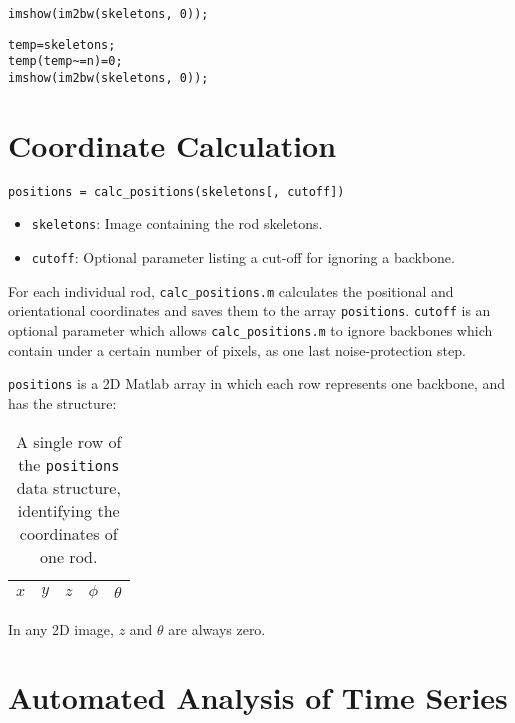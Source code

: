 \begin{lstlisting}[label=ls:allbb,caption=Show all backbones as an image]
imshow(im2bw(skeletons, 0));
\end{lstlisting}

\begin{lstlisting}[label=ls:onebb,caption=Show only backbone with label $n$]
temp=skeletons;
temp(temp~=n)=0;
imshow(im2bw(skeletons, 0));
\end{lstlisting}

\section{Coordinate Calculation}

\texttt{positions = calc\_positions(skeletons[, cutoff])}

\begin{itemize}
\item \texttt{skeletons}: Image containing the rod skeletons.
\item \texttt{cutoff}: Optional parameter listing a cut-off for ignoring a backbone.
\end{itemize}

For each individual rod, \texttt{calc\_positions.m} calculates the positional and
orientational coordinates and saves them to the array \texttt{positions}.  
\texttt{cutoff} is an optional parameter which allows \texttt{calc\_positions.m} to 
ignore backbones which contain under a certain number of pixels, as one last noise-protection step.

\texttt{positions} is a 2D Matlab array in which each row represents one backbone, and has 
the structure:

\begin{table}[h]
\begin{center}
\begin{tabular}{ | c | c | c | c | c | }
\hline 
$x$ & $y$ & $z$ & $\phi$ & $\theta$ \\
\hline
\end{tabular}
\end{center}
\caption{A single row of the \texttt{positions} data structure, identifying the coordinates of one rod.}
\label{tab:positions}
\end{table}

In any 2D image, $z$ and $\theta$ are always zero.

\section{Automated Analysis of Time Series}

